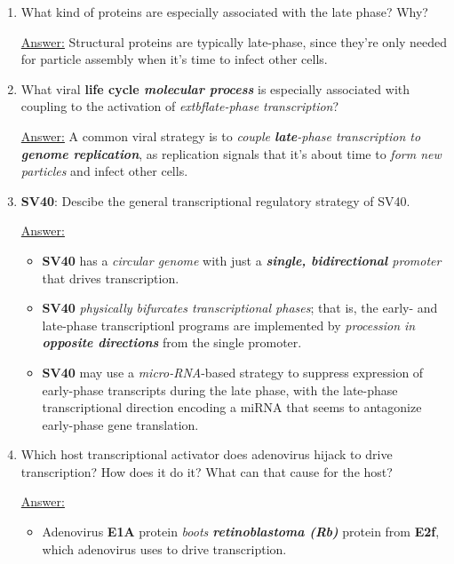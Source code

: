 \documentclass{article}
\newenvironment{QandA}{\begin{enumerate}[label=\bfseries Q\arabic*.]}
                       {\end{enumerate}}
\newenvironment{answered}{\par\normalfont\underline{Answer:}}{}
\begin{document}
\begin{QandA}
\begin{answered}
    \end{answered}
  \item{What kind of proteins are especially associated with the late phase? Why?}
    \begin{answered}
    Structural proteins are typically late-phase, since they're only needed for particle assembly when it's time to infect other cells.
    \end{answered}
  \item{What viral \textbf{life cycle \textit{molecular process}} is especially associated with coupling to the activation of \textit{	extbf{late-phase} transcription}?}
    \begin{answered}
    A common viral strategy is to \textit{couple \textbf{late}-phase transcription to \textbf{genome replication}}, as replication signals that it's about time to \textit{form new particles} and infect other cells.
    \end{answered}
  \item{\textbf{SV40}: Descibe the general transcriptional regulatory strategy of SV40.}
    \begin{answered}
    \begin{itemize}
      \item{\textbf{SV40} has a \textit{circular genome} with just a \textit{\textbf{single, bidirectional} promoter} that drives transcription.}
      \item{\textbf{SV40} \textit{physically bifurcates transcriptional phases}; that is, the early- and late-phase transcriptionl programs are implemented by \textit{procession in \textbf{opposite directions}} from the single promoter.}
      \item{\textbf{SV40} may use a \textit{micro-RNA}-based strategy to suppress expression of early-phase transcripts during the late phase, with the late-phase transcriptional direction encoding a miRNA that seems to antagonize early-phase gene translation.}
    \end{itemize}
    \end{answered}
  \item{Which host transcriptional activator does adenovirus hijack to drive transcription? How does it do it? What can that cause for the host?}
    \begin{answered}
    \begin{itemize}
      \item{Adenovirus \textbf{E1A} protein \textit{boots \textbf{retinoblastoma (Rb)}} protein from \textbf{E2f}, which adenovirus uses to drive transcription.}

\end{itemize}
\end{answered}
\end{QandA}
\end{document}
